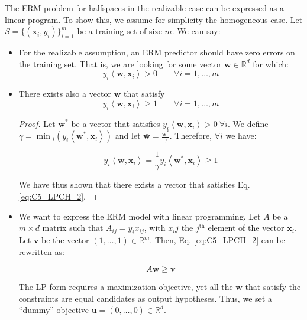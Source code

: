 \documentclass[../../main/main.tex]{subfiles}
\begin{document}
The ERM problem for halfspaces in the realizable case can be expressed as a linear program. To show this, we assume for simplicity the homogeneous case. Let \( S = \{ (\mathbf{x}_i, y_i) \}_{i=1}^{m} \) be a training set of size \( m \). We can say:
\begin{itemize}
    \item For the realizable assumption, an ERM predictor should have zero errors on the training set. That is, we are looking for some vector \( \mathbf{w} \in \mathbb{R}^d \) for which:
        \begin{equation}
            y_i \left\langle \mathbf{w}, \mathbf{x}_i \right\rangle > 0
            \qquad
            \forall i = 1, \dots, m
            \label{eq:C5_LPCH}
        \end{equation}

    \item There exists also a vector \( \mathbf{w} \) that satisfy
        \begin{equation}
            y_i \left\langle \mathbf{w}, \mathbf{x}_i \right\rangle \ge 1
            \qquad
            \forall i = 1, \dots, m
            \label{eq:C5_LPCH_2}
        \end{equation}

        \begin{proof}
            Let \( \mathbf{w}^* \) be a vector that satisfies \( y_i \left\langle \mathbf{w}, \mathbf{x}_i \right\rangle > 0 \ \forall i \).
            We define \( \gamma = \min{}_i(y_i \left\langle \mathbf{w}^*, \mathbf{x}_i \right\rangle) \) and let \( \bar{\mathbf{w}} = \frac{\mathbf{w}^*}{\gamma} \).
            Therefore, \( \forall i \) we have:

            \[
                y_i \left\langle \bar{\mathbf{w}}, \mathbf{x}_i \right\rangle
                =
                \frac{1}{\gamma} y_i \left\langle \mathbf{w}^*, \mathbf{x}_i \right\rangle
                \ge
                1
            \]

            We have thus shown that there exists a vector that satisfies Eq. \ref{eq:C5_LPCH_2}.
        \end{proof}

    \item We want to express the ERM model with linear programming.
        Let \( A \) be a \( m \times d \) matrix such that \( A_{ij} = y_i x_{ij} \), with \( x_ij \) the \( j^{\text{th}} \) element of the vector \( \mathbf{x}_i \).
        Let \( \mathbf{v} \) be the vector \( (1,\dots,1) \in \mathbb{R}^m \). Then, Eq. \ref{eq:C5_LPCH_2} can be rewritten as:

        \[
            A \mathbf{w} \ge \mathbf{v}
        \]

        The LP form requires a maximization objective, yet all the \( \mathbf{w} \) that satisfy the constraints are equal candidates as output hypotheses. Thus, we set a ``dummy'' objective \( \mathbf{u} = (0,\dots,0) \in \mathbb{R}^d \).
\end{itemize}
\end{document}
